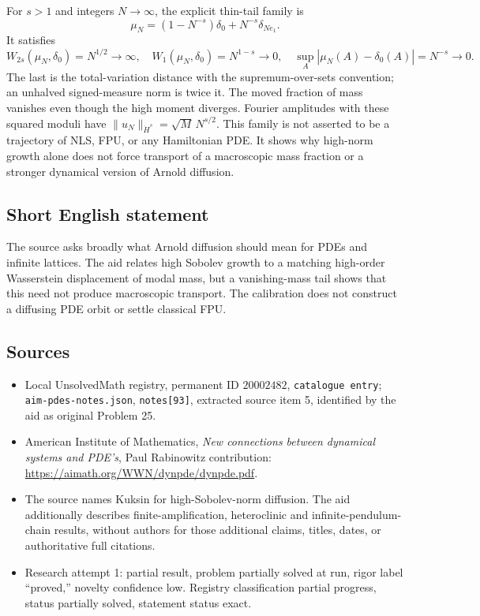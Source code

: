 \documentclass[11pt]{article}
\begin{document}
For $s>1$ and integers $N\to\infty$, the explicit thin-tail family is
\[
\mu_N=(1-N^{-s})\delta_0+N^{-s}\delta_{Ne_1}.
\]
It satisfies
\[
W_{2s}(\mu_N,\delta_0)=N^{1/2}\to\infty,
\quad W_1(\mu_N,\delta_0)=N^{1-s}\to0,
\quad\sup_A|\mu_N(A)-\delta_0(A)|=N^{-s}\to0.
\]
The last is the total-variation distance with the supremum-over-sets convention; an unhalved signed-measure norm is twice it. The moved fraction of mass vanishes even though the high moment diverges. Fourier amplitudes with these squared moduli have $\|u_N\|_{\dot H^s}=\sqrt M\,N^{s/2}$. This family is not asserted to be a trajectory of NLS, FPU, or any Hamiltonian PDE. It shows why high-norm growth alone does not force transport of a macroscopic mass fraction or a stronger dynamical version of Arnold diffusion.
\subsection{Short English statement}
The source asks broadly what Arnold diffusion should mean for PDEs and infinite lattices. The aid relates high Sobolev growth to a matching high-order Wasserstein displacement of modal mass, but a vanishing-mass tail shows that this need not produce macroscopic transport. The calibration does not construct a diffusing PDE orbit or settle classical FPU.
\subsection{Sources}
\begin{itemize}
\item Local UnsolvedMath registry, permanent ID $20002482$, \texttt{catalogue entry}; \texttt{aim-pdes-notes.json}, \texttt{notes[93]}, extracted source item 5, identified by the aid as original Problem 25.
\item American Institute of Mathematics, \emph{New connections between dynamical systems and PDE's}, Paul Rabinowitz contribution: \url{https://aimath.org/WWN/dynpde/dynpde.pdf}.
\item The source names Kuksin for high-Sobolev-norm diffusion. The aid additionally describes finite-amplification, heteroclinic and infinite-pendulum-chain results, without authors for those additional claims, titles, dates, or authoritative full citations.
\item Research attempt 1: partial result, problem partially solved at run, rigor label ``proved,'' novelty confidence low. Registry classification partial progress, status partially solved, statement status exact.
\end{itemize}
\end{document}
